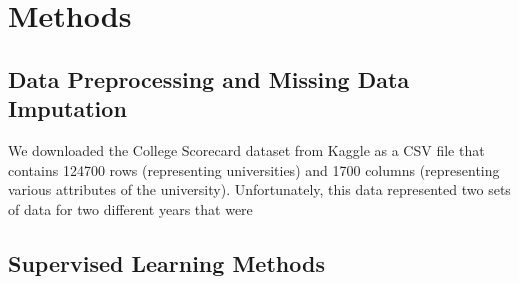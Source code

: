 \documentclass{article} %
\begin{document}
\section{Methods}

\subsection{Data Preprocessing and Missing Data Imputation}

We downloaded the College Scorecard dataset from Kaggle as a CSV file that contains 124700 rows (representing universities) and 1700 columns (representing various attributes of the university).  Unfortunately, this data represented two sets of data for two different years that were 



\subsection{Supervised Learning Methods}
\end{document}
